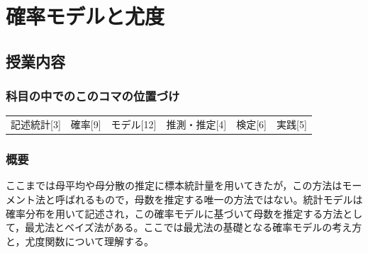 \section{確率モデルと尤度}
\label{s23_Probabilitic_model}

\subsection{授業内容}
\subsubsection{科目の中でのこのコマの位置づけ}
\begin{tabular}[t]{cccccc}
	記述統計[3] & 確率[9] & モデル[12] & 推測・推定[4] & 検定[6] & 実践[5]
\end{tabular}

\subsubsection{概要}
ここまでは母平均や母分散の推定に標本統計量を用いてきたが，この方法はモーメント法と呼ばれるもので，母数を推定する唯一の方法ではない。統計モデルは確率分布を用いて記述され，この確率モデルに基づいて母数を推定する方法として，最尤法とベイズ法がある。ここでは最尤法の基礎となる確率モデルの考え方と，尤度関数について理解する。
